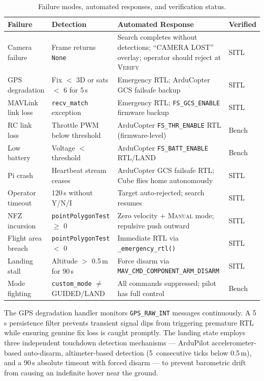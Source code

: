 \begin{table}[htbp]
\centering
\caption{Failure modes, automated responses, and verification status.}
\label{tab:failure-modes}
\small
\begin{tabular}{p{2.3cm}p{2.8cm}p{5.0cm}p{1.8cm}}
\toprule
\textbf{Failure} & \textbf{Detection} & \textbf{Automated Response} & \textbf{Verified} \\
\midrule
Camera failure & Frame returns \texttt{None} & Search completes without detections; ``CAMERA LOST'' overlay; operator should reject at \textsc{Verify} & SITL \\
GPS degradation & Fix $<$ 3D or sats $<$ 6 for 5\,s & Emergency RTL; ArduCopter GCS failsafe backup & SITL \\
MAVLink link loss & \texttt{recv\_match} exception & Emergency RTL; \texttt{FS\_GCS\_ENABLE} firmware backup & SITL \\
RC link loss & Throttle PWM below threshold & ArduCopter \texttt{FS\_THR\_ENABLE} RTL (firmware-level) & Bench \\
Low battery & Voltage $<$ threshold & ArduCopter \texttt{FS\_BATT\_ENABLE} RTL/LAND & Bench \\
Pi crash & Heartbeat stream ceases & ArduCopter GCS failsafe RTL; Cube flies home autonomously & SITL \\
Operator timeout & 120\,s without Y/N/I & Target auto-rejected; search resumes & SITL \\
NFZ incursion & \texttt{pointPolygonTest} $\geq$ 0 & Zero velocity + \textsc{Manual} mode; repulsive push outward & SITL \\
Flight area breach & \texttt{pointPolygonTest} $<$ 0 & Immediate RTL via \texttt{\_emergency\_rtl()} & SITL \\
Landing stall & Altitude $>$ 0.5\,m for 90\,s & Force disarm via \texttt{MAV\_CMD\_COMPONENT\_ARM\_DISARM} & SITL \\
Mode fighting & \texttt{custom\_mode} $\neq$ GUIDED/LAND & All commands suppressed; pilot has full control & Bench \\
\bottomrule
\end{tabular}
\end{table}

The GPS degradation handler monitors \texttt{GPS\_RAW\_INT} messages continuously. A 5\,s persistence filter prevents transient signal dips from triggering premature RTL while ensuring genuine fix loss is caught promptly. The landing state employs three independent touchdown detection mechanisms --- ArduPilot accelerometer-based auto-disarm, altimeter-based detection (5~consecutive ticks below 0.5\,m), and a 90\,s absolute timeout with forced disarm --- to prevent barometric drift from causing an indefinite hover near the ground.

